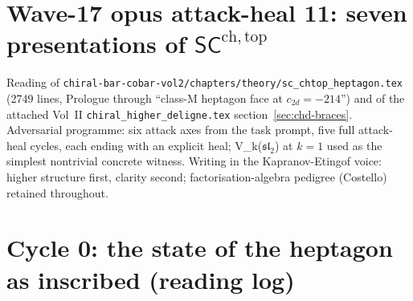 
\providecommand{\SCchtop}{\mathsf{SC}^{\mathrm{ch},\mathrm{top}}}
\providecommand{\FM}{\mathrm{FM}}
\providecommand{\Conf}{\mathrm{Conf}}
\providecommand{\ChirHoch}{\mathrm{ChirHoch}}
\providecommand{\Obs}{\mathsf{Obs}}
\providecommand{\Rep}{\mathrm{Rep}}
\providecommand{\cZ}{\mathcal{Z}}
\providecommand{\cA}{\mathcal{A}}
\providecommand{\cM}{\mathcal{M}}
\providecommand{\cY}{\mathcal{Y}}
\providecommand{\Ran}{\mathrm{Ran}}
\providecommand{\Dmod}{D\text{-}\mathsf{mod}}
\providecommand{\ChirAlg}{\mathsf{ChirAlg}}
\providecommand{\End}{\mathrm{End}}
\providecommand{\Lie}{\mathsf{Lie}}
\providecommand{\Ass}{\mathsf{Ass}}
\providecommand{\id}{\mathrm{id}}
\providecommand{\Hom}{\mathrm{Hom}}
\providecommand{\Dhol}{\mathrm{HolFA}}
\providecommand{\MC}{\mathrm{MC}}
\providecommand{\Eone}{E_1}
\providecommand{\fg}{\mathfrak{g}}
\providecommand{\fsl}{\mathfrak{sl}}

\section*{Wave-17 opus attack-heal 11: seven presentations of \texorpdfstring{$\SCchtop$}{SC\textasciicircum ch,top}}

Reading of \texttt{chiral-bar-cobar-vol2/chapters/theory/sc\_chtop\_heptagon.tex} (2749 lines, Prologue through ``class-$\mathrm M$ heptagon face at $c_{2d} = -214$'') and of the attached Vol~II \texttt{chiral\_higher\_deligne.tex} section~\ref*{sec:chd-braces}. Adversarial programme: six attack axes from the task prompt, five full attack-heal cycles, each ending with an explicit heal; V_k($\fsl_2$) at $k = 1$ used as the simplest nontrivial concrete witness. Writing in the Kapranov-Etingof voice: higher structure first, clarity second; factorisation-algebra pedigree (Costello) retained throughout.

\section{Cycle 0: the state of the heptagon as inscribed (reading log)}


